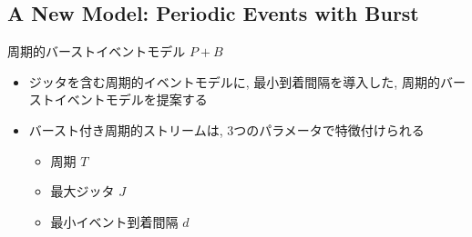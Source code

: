 


\subsection{A New Model: Periodic Events with Burst}
\label{ssec: a new model: periodic events with burst}

\begin{frame}{周期的バーストイベントモデル $P+B$}
    \begin{itemize}
        \item ジッタを含む周期的イベントモデルに, 最小到着間隔を導入した, 周期的バーストイベントモデルを提案する
        \item バースト付き周期的ストリームは, 3つのパラメータで特徴付けられる
              \begin{itemize}
                  \item 周期 $T$
                  \item 最大ジッタ $J$
                  \item 最小イベント到着間隔 $d$
              \end{itemize}
    \end{itemize}
\end{frame}

